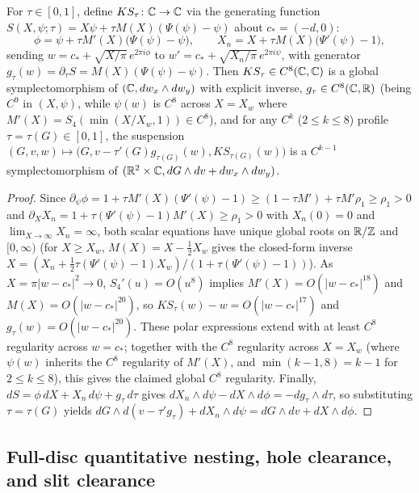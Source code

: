 \begin{proposition}\label{prop:ks-symp}
For $\tau\in[0,1]$, define $KS_\tau\colon\mathbb{C}\to\mathbb{C}$ via the generating function
$S(X,\psi;\tau)=X\psi+\tau M(X)(\Psi(\psi)-\psi)$ about $c_*=(-d,0)$:
\begin{equation}\label{eq:KS}
 \phi = \psi + \tau M'(X)\bigl(\Psi(\psi)-\psi\bigr),\qquad
 X_n = X + \tau M(X)\bigl(\Psi'(\psi)-1\bigr),
\end{equation}
sending $w=c_*+\sqrt{X/\pi}\,e^{2\pi i\phi}$ to $w'=c_*+\sqrt{X_n/\pi}\,e^{2\pi i\psi}$, with generator
$g_\tau(w)=\partial_\tau S=M(X)(\Psi(\psi)-\psi)$. Then $KS_\tau\in C^8(\mathbb{C},\mathbb{C})$ is a global symplectomorphism of
$(\mathbb{C},dw_x\wedge dw_y)$ with explicit inverse, $g_\tau\in C^8(\mathbb{C},\mathbb{R})$ (being $C^9$ in $(X,\psi)$, while $\psi(w)$ is
$C^8$ across $X=X_w$ where $M'(X)=S_4(\min(X/X_w,1))\in C^8$), and for any $C^k$ ($2\le k\le8$) profile
$\tau=\tau(G)\in[0,1]$, the suspension $(G,v,w)\mapsto\bigl(G,v-\tau'(G)g_{\tau(G)}(w),KS_{\tau(G)}(w)\bigr)$ is a
$C^{k-1}$ symplectomorphism of $(\mathbb{R}^2\times\mathbb{C},dG\wedge dv+dw_x\wedge dw_y)$.
\end{proposition}

\begin{proof}
Since $\partial_\psi\phi=1+\tau M'(X)(\Psi'(\psi)-1)\ge(1-\tau M')+\tau M'\rho_1\ge\rho_1>0$ and
$\partial_XX_n=1+\tau(\Psi'(\psi)-1)M'(X)\ge\rho_1>0$ with $X_n(0)=0$ and $\lim_{X\to\infty}X_n=\infty$, both scalar
equations have unique global roots on $\mathbb{R}/\mathbb{Z}$ and $[0,\infty)$ (for $X\ge X_w$, $M(X)=X-\frac12X_w$ gives the closed-form
inverse $X=(X_n+\frac12\tau(\Psi'(\psi)-1)X_w)/(1+\tau(\Psi'(\psi)-1))$). As $X=\pi|w-c_*|^2\to0$, $S_4'(u)=O(u^8)$
implies $M'(X)=O(|w-c_*|^{18})$ and $M(X)=O(|w-c_*|^{20})$, so $KS_\tau(w)-w=O(|w-c_*|^{17})$ and
$g_\tau(w)=O(|w-c_*|^{20})$. These polar expressions extend with at least $C^8$ regularity across $w=c_*$; together with
the $C^8$ regularity across $X=X_w$ (where $\psi(w)$ inherits the $C^8$ regularity of $M'(X)$, and $\min(k-1,8)=k-1$ for
$2\le k\le8$), this gives the claimed global $C^8$ regularity. Finally, $dS=\phi\,dX+X_n\,d\psi+g_\tau\,d\tau$ gives
$dX_n\wedge d\psi-dX\wedge d\phi=-dg_\tau\wedge d\tau$, so substituting $\tau=\tau(G)$ yields
$dG\wedge d(v-\tau'g_\tau)+dX_n\wedge d\psi=dG\wedge dv+dX\wedge d\phi$.
\end{proof}

\subsection{Full-disc quantitative nesting, hole clearance, and slit clearance}\label{sec:kh-bounds}

